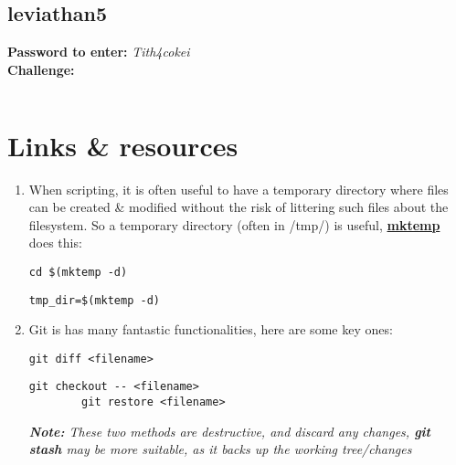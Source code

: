 \documentclass[a4paper]{article}
\newcommand{\pass}[1]{\textbf{Password to enter:} \textit{#1}\\}
\newcommand{\chall}{\textbf{Challenge:} }
\newcommand{\note}[1]{\textit{\textbf{Note:} #1}\\}
\begin{document}
\subsection*{leviathan5}
\pass{Tith4cokei}
\chall
\begin{lstlisting}
\end{lstlisting}


\section*{Links \& resources}
\begin{enumerate}

\item When scripting, it is often useful to have a temporary directory where files can be created \& modified without the risk of littering such files about the filesystem. So a temporary directory (often in /tmp/) is useful, \href{https://code-maven.com/create-temporary-directory-on-linux-using-bash}{\textbf{mktemp}} does this:
	\begin{lstlisting}[title=move to the new temporary directory]
	cd $(mktemp -d)
	\end{lstlisting}
	\begin{lstlisting}[title=store the new temporary directory path]
	tmp_dir=$(mktemp -d)
	\end{lstlisting}
	
\item Git is has many fantastic functionalities, here are some key ones:
	\begin{lstlisting}[title=compare working tree with commited version]
		git diff <filename> 
	\end{lstlisting}
	\begin{lstlisting}[title=reset working tree file to the commited version]
		git checkout -- <filename>
		git restore <filename>
	\end{lstlisting}
	\note{These two methods are destructive, and discard any changes, \textbf{git stash} may be more suitable, as it backs up the working tree/changes}
\end{enumerate}
\end{document}
